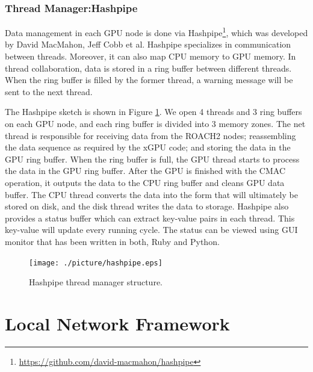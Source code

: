 \documentclass{ws-jai}
\begin{document}
\subsubsection{Thread Manager:Hashpipe}	
	
	Data management in each GPU node is done via Hashpipe\footnote{\url{https://github.com/david-macmahon/hashpipe}}, which was developed by David MacMahon, Jeff Cobb et al. Hashpipe specializes in communication between threads. Moreover, it can also map CPU memory to GPU memory. In thread collaboration, data is stored in a ring buffer between different threads. When the ring buffer is filled by the former thread, a warning message will be sent to the next thread. 

	The Hashpipe sketch is shown in Figure \ref{fig:hashpipe}. We open 4 threads and 3 ring buffers on each GPU node, and each ring buffer is divided into 3 memory zones. The net thread is responsible for receiving data from the ROACH2 nodes; reassembling the data sequence as required by the xGPU code; and storing the data in the GPU ring buffer. When the ring buffer is full, the GPU thread starts to process the data in the GPU ring buffer. After the GPU is finished with the CMAC operation, it outputs the data to the CPU ring buffer and cleans GPU data buffer. The CPU thread converts the data into the form that will ultimately be stored on disk, and the disk thread writes the data to storage.
	Hashpipe also provides a status buffer which can extract key-value pairs in each thread. This key-value will update every running cycle. The status can be viewed using GUI monitor that has been written in both, Ruby and Python. 
\begin{figure}[t]
 \centering
 \texttt{[image: ./picture/hashpipe.eps]}
\caption{Hashpipe thread manager structure.\label{fig:hashpipe}}
\end{figure}

\section{Local Network Framework \label{sec:Local Network}}
\end{document}
